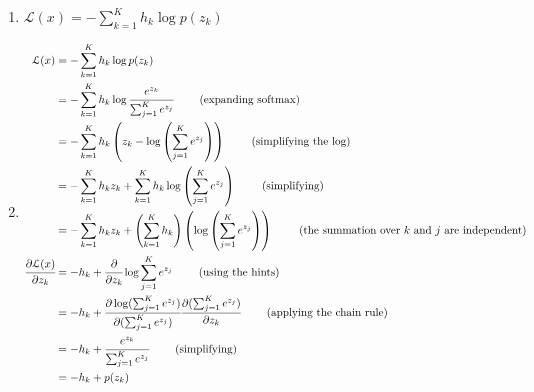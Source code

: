 \begin{solution}

\begin{enumerate}
\item $\mathcal{L}(x) = - \sum_{k=1}^K h_k \log p(z_k)$
\item
\begin{align*}
		\mathcal{L}(x) &= - \sum_{k=1}^K h_k \log p(z_k) \\
		&= - \sum_{k=1}^K h_k \log \cfrac{e^{z_k}}{\sum_{j=1}^K e^{z_j}} \quad\quad \text{ (expanding softmax)}\\
		&= - \sum_{k=1}^K h_k \left(z_k - \log\left(\sum_{j=1}^K e^{z_j}\right)\right)\quad\quad \text{ (simplifying the log)}\\
	 	&= - \sum_{k=1}^K h_k z_k + \sum_{k=1}^K h_k \log\left(\sum_{j=1}^K e^{z_j}\right)\quad\quad \text{ (simplifying)}\\
		&= - \sum_{k=1}^K h_k z_k + \left(\sum_{k=1}^K h_k \right)\left( \log\left(\sum_{j=1}^K e^{z_j}\right)\right)\quad\quad \text{ (the summation over $k$ and $j$ are independent)}\\
	\cfrac{\partial \mathcal{L}(x)}{\partial z_k} &= -h_k + \cfrac{\partial}{\partial z_k} \log \sum_{j=1}^K e^{z_j}\quad\quad \text{ (using the hints)}\\
	&= -h_k + \cfrac{\partial \log (\sum_{j=1}^K e^{z_j})}{\partial (\sum_{j=1}^K e^{z_j})}  \cfrac{\partial (\sum_{j=1}^K e^{z_j})}{\partial z_k} \quad\quad \text{ (applying the chain rule)}\\
	&= -h_k + \cfrac{e^{z_k}}{\sum_{j=1}^K e^{z_j}}\quad\quad \text{ (simplifying)}\\
	&= -h_k + p(z_k)
\end{align*}


\end{enumerate}
\end{solution}
